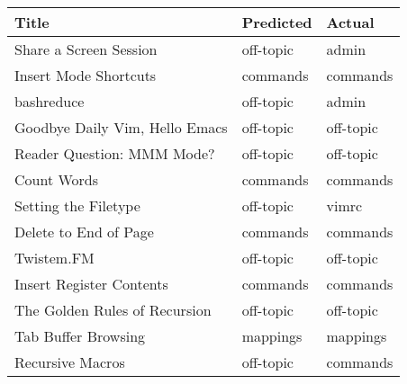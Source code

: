 \begin{tabular}{lll}
\hline
 Title                          & Predicted   & Actual    \\
\hline
 Share a Screen Session         & off-topic   & admin     \\
 Insert Mode Shortcuts          & commands    & commands  \\
 bashreduce                     & off-topic   & admin     \\
 Goodbye Daily Vim, Hello Emacs & off-topic   & off-topic \\
 Reader Question: MMM Mode?     & off-topic   & off-topic \\
 Count Words                    & commands    & commands  \\
 Setting the Filetype           & off-topic   & vimrc     \\
 Delete to End of Page          & commands    & commands  \\
 Twistem.FM                     & off-topic   & off-topic \\
 Insert Register Contents       & commands    & commands  \\
 The Golden Rules of Recursion  & off-topic   & off-topic \\
 Tab Buffer Browsing            & mappings    & mappings  \\
 Recursive Macros               & off-topic   & commands  \\
\hline
\end{tabular}